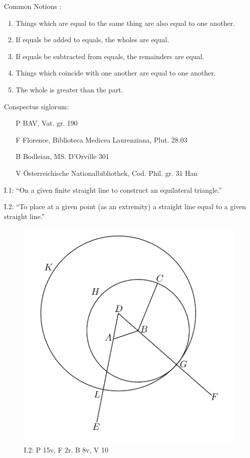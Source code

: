 \documentclass{article}
\begin{document}
Common Notions \cite[p.~155]{euclidI}:

\begin{enumerate}
\item Things which are equal to the same thing are also equal to one another.
\item If equals be added to equals, the wholes are equal.
\item If equals be subtracted from equals, the remainders
are equal.
\item Things which coincide with one another are equal to
one another.
\item The whole is greater than the part.
\end{enumerate}

Conspectus siglorum: 

\begin{itemize}
\item[P] BAV, Vat. gr. 190
\item[F] Florence, Biblioteca Medicea Laurenziana, Plut. 28.03
\item[B] Bodleian, MS. D'Orville 301
\item[V] \"Osterreichische Nationalbibliothek, Cod. Phil. gr. 31 Han
\end{itemize}

I.1: ``On a given finite straight line to construct an equilateral
triangle.''

I.2: ``To place at a given point (as an extremity) a straight line equal to a given straight line.''

\begin{figure}
\begin{center}
\includegraphics[width=\textwidth]{I2.png}
\end{center}
\caption{I.2: P 15v, F 2r, B 8v, V 10}
\label{I2}
\end{figure}
\end{document}
